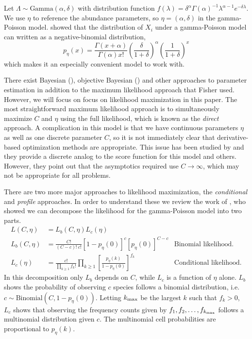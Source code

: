 \documentclass[oupdraft]{bio}
\begin{document}
Let $\Lambda \sim \text{Gamma}(\alpha, \delta)$ with distribution function $f(\lambda) = \delta^\alpha \Gamma (\alpha)^{-1} \lambda^{\alpha - 1} e^{-\delta \lambda}$.  We use $\eta$ to reference the abundance parameters, so $\eta = (\alpha, \delta)$ in the gamma-Poisson model.  \citet{greenwood_1920} showed that the distribution of $X_i$ under a gamma-Poisson model can written as a negative-binomial distribution,
\[ p_{\eta}(x) = \frac{\Gamma (x + \alpha)}{\Gamma (\alpha) x!} \left(\frac{\delta}{1+\delta} \right)^\alpha \left( \frac{1}{1+ \delta} \right)^x \]
which makes it an especially convenient model to work with.

There exist Bayesian (\citet{efron_1976}), objective Bayesian (\citet{barger_2010}) and other approaches to parameter estimation in addition to the maximum likelihood approach that Fisher used.  However, we will focus on focus on likelihood maximization in this paper.  The most straightforward maximum likelihood approach is to simultaneously maximize $C$ and $\eta$ using the full likelihood, which is known as the \textit{direct} approach.  A complication in this model is that we have continuous parameters $\eta$ as well as one discrete parameter $C$, so it is not immediately clear that derivative-based optimization methods are appropriate.  This issue has been studied by \citet{lindsay_1987} and they provide a discrete analog to the score function for this model and others.  However, they point out that the asymptotics required use $C \to \infty$, which may not be appropriate for all problems.

There are two more major approaches to likelihood maximization, the \textit{conditional} and \textit{profile} approaches.  In order to understand these we review the work of \citet{sanathanan_1977}, who showed we can decompose the likelihood for the gamma-Poisson model into two parts.
\begin{align}
 L(C, \eta) &= L_b(C, \eta)L_c(\eta) \label{eq:likelihood}\\
 L_b(C, \eta) &= \frac{C!}{(C-c)! \ c!} \left[1 - p_{\eta}(0) \right]^c \left[ p_{\eta}(0) \right]^{C-c}  & \text{Binomial likelihood.} \label{eq:binomial_likelihood}\\
 L_c(\eta) &= \frac{c!}{\displaystyle  \prod_{k \geq 1} f_k!} \prod_{k \geq 1} \left[ \frac{p_{\eta}(k)}{1-p_{\eta}(0)} \right]^{f_k} \label{eq:conditional_likelihood}  & \text{Conditional likelihood.}
\end{align}
In this decomposition only $L_b$ depends on $C$, while $L_c$ is a function of $\eta$ alone.  $L_b$ shows the probability of observing $c$ species follows a binomial distribution, i.e. $c \sim \text{Binomial}\left(C, 1- p_{\eta}(0)\right)$.  Letting $\kmax$ be the largest $k$ such that $f_k > 0$, $L_c$ shows that observing the frequency counts given by $f_1, f_2, \dots , f_{\kmax}$ follows a multinomial distribution given $c$.  The multinomial cell probabilities are proportional to $p_{\eta}(k)$.
\end{document}
